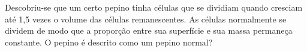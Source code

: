 Descobriu-se que um certo pepino tinha células que se dividiam quando cresciam até 1,5 vezes o volume das células remanescentes. As células normalmente se dividem de modo que a proporção entre sua superfície e sua massa permaneça constante. O pepino é descrito como um pepino normal?

